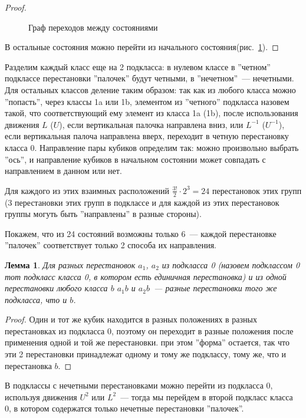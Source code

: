 \documentclass[utf8,a4paper,12pt]{article}
\newtheorem{lemma_cub}{Лемма}[section]
\begin{document}
\begin{proof}
\begin{figure}[ht]
\caption{Граф переходов между состояниями\label{states_graph}}
\end{figure}
В остальные состояния можно перейти из начального состояния(рис.~\ref{states_graph}).
\end{proof}
Разделим каждый класс еще на 2 подкласса: в нулевом классе в ''четном'' подклассе перестановки ''палочек''  будут четными, в ''нечетном''~--- нечетными. Для остальных классов деление таким образом: так как из любого класса можно ''попасть'', через классы 1a или 1b, элементом из ''четного'' подкласса назовем такой, что соответствующий ему элемент из класса 1a (1b), после использования движения $L$ ($U$), если вертикальная палочка направлена вниз, или $L^{-1}$ ($U^{-1}$), если вертикальная палоча направлена вверх, переходит в четную перестановку класса 0. Направление пары кубиков определим так: можно произвольно выбрать ''ось'', и направление кубиков в начальном состоянии может совпадать с направлением в данном или нет.

Для каждого из этих взаимных расположений $\frac{3!}{2}\cdot 2^3=24$ перестановок этих групп (3 перестановки этих групп в подклассе и для каждой из этих перестановок группы могуть быть ''направлены'' в разные стороны).

Покажем, что из 24 состояний возможны только 6~--- каждой перестановке ''палочек'' соответствует только 2 способа их направления.
\begin{lemma_cub}
Для разных перестановок $a_1$, $a_2$ из подкласса 0 (назовем подклассом 0 тот подкласс класса 0, в котором есть единичная перестановка) и из одной перестановки любого класса $b$ $a_1b$ и $a_2b$~--- разные перестановки того же подкласса, что и $b$.\label{lemma_classes}
\end{lemma_cub}
\begin{proof}
Один и тот же кубик находится в разных положениях в разных перестановках из подкласса 0, поэтому он переходит в разные положения после применения одной и той же перестановки. при этом ''форма'' остается, так что эти 2 перестановки принадлежат одному и тому же подклассу, тому же, что и перестановка $b$.
\end{proof}
В подклассы с нечетными перестановками можно перейти из подкласса 0, используя движения $U^2$ или $L^2$~--- тогда мы перейдем в второй подкласс класса 0, в котором содержатся только нечетные перестановки ''палочек''.
\end{document}
